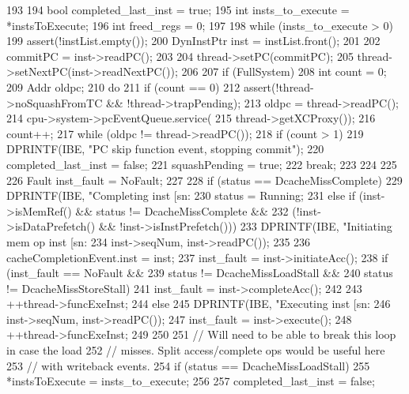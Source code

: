 \begin{DoxyCode}
193 {
194     bool completed_last_inst = true;
195     int insts_to_execute = *instsToExecute;
196     int freed_regs = 0;
197 
198     while (insts_to_execute > 0) {
199         assert(!instList.empty());
200         DynInstPtr inst = instList.front();
201 
202         commitPC = inst->readPC();
203 
204         thread->setPC(commitPC);
205         thread->setNextPC(inst->readNextPC());
206 
207         if (FullSystem) {
208             int count = 0;
209             Addr oldpc;
210             do {
211                 if (count == 0)
212                     assert(!thread->noSquashFromTC && !thread->trapPending);
213                 oldpc = thread->readPC();
214                 cpu->system->pcEventQueue.service(
215                     thread->getXCProxy());
216                 count++;
217             } while (oldpc != thread->readPC());
218             if (count > 1) {
219                 DPRINTF(IBE, "PC skip function event, stopping commit\n");
220                 completed_last_inst = false;
221                 squashPending = true;
222                 break;
223             }
224         }
225 
226         Fault inst_fault = NoFault;
227 
228         if (status == DcacheMissComplete) {
229             DPRINTF(IBE, "Completing inst [sn:%
230             status = Running;
231         } else if (inst->isMemRef() && status != DcacheMissComplete &&
232             (!inst->isDataPrefetch() && !inst->isInstPrefetch())) {
233             DPRINTF(IBE, "Initiating mem op inst [sn:%
234                     inst->seqNum, inst->readPC());
235 
236             cacheCompletionEvent.inst = inst;
237             inst_fault = inst->initiateAcc();
238             if (inst_fault == NoFault &&
239                 status != DcacheMissLoadStall &&
240                 status != DcacheMissStoreStall) {
241                 inst_fault = inst->completeAcc();
242             }
243             ++thread->funcExeInst;
244         } else {
245             DPRINTF(IBE, "Executing inst [sn:%
246                     inst->seqNum, inst->readPC());
247             inst_fault = inst->execute();
248             ++thread->funcExeInst;
249         }
250 
251         // Will need to be able to break this loop in case the load
252         // misses.  Split access/complete ops would be useful here
253         // with writeback events.
254         if (status == DcacheMissLoadStall) {
255             *instsToExecute = insts_to_execute;
256 
257             completed_last_inst = false;
}}}
\end{DoxyCode}
